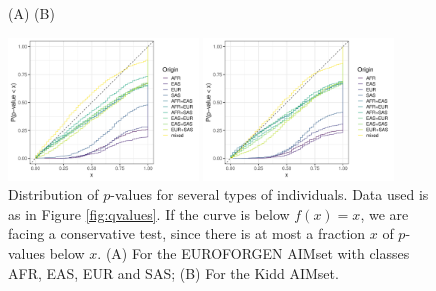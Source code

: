\documentclass[12pt]{article}
\theoremstyle{definition}
\begin{document}
\begin{figure}[htb]
  \hspace{3cm} (A) \hspace{7cm} (B)
  \begin{center}
    \parbox[b]{0.45\textwidth}{\includegraphics[width=0.45\textwidth]{pvalues_EUROFORGEN_1ksim_H0.pdf}}    \parbox[b]{0.45\textwidth}{\includegraphics[width=0.45\textwidth]{pvalues_Kidd_1ksim_H0.pdf}}
  \end{center}
  \caption{\label{fig:pvalues} Distribution of $p$-values for several types of individuals. Data used is as in Figure \ref{fig:qvalues}. If the curve is below $f(x) = x$, we are facing a conservative test, since there is at most a fraction $x$ of $p$-values below $x$. (A) For the EUROFORGEN AIMset with classes AFR, EAS, EUR and SAS; (B) For the Kidd AIMset.}
\end{figure}
\end{document}
